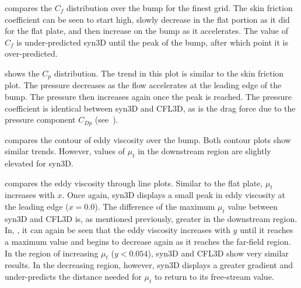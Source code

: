  compares the $C_f$ distribution over the bump for the finest grid. The skin friction coefficient can be seen to start high, slowly decrease in the flat portion as it did for the flat plate, and then increase on the bump as it accelerates. The value of $C_f$ is under-predicted syn3D until the peak of the bump, after which point it is over-predicted.

 shows the $C_p$ distribution. The trend in this plot is similar to the skin friction plot. The pressure decreases as the flow accelerates at the leading edge of the bump. The pressure then increases again once the peak is reached. The pressure coefficient is identical between syn3D and CFL3D, as is the drag force due to the pressure component $C_{Dp}$ (see~).

 compares the contour of eddy viscosity over the bump. Both contour plots show similar trends. However, values of $\mu_t$ in the downstream region are slightly elevated for syn3D.

 compares the eddy viscosity through line plots. Similar to the flat plate, $\mu_t$ increases with $x$. Once again, syn3D displays a small peak in eddy viscosity at the leading edge ($x=0.0$). The difference of the maximum $\mu_t$ value between syn3D and CFL3D is, as mentioned previously, greater in the downstream region. In, , it can again be seen that the eddy viscosity increases with $y$ until it reaches a maximum value and begins to decrease again as it reaches the far-field region. In the region of increasing $\mu_t$ ($y < 0.054$), syn3D and CFL3D show very similar results. In the decreasing region, however, syn3D displays a greater gradient and under-predicts the distance needed for $\mu_t$ to return to its free-stream value.

